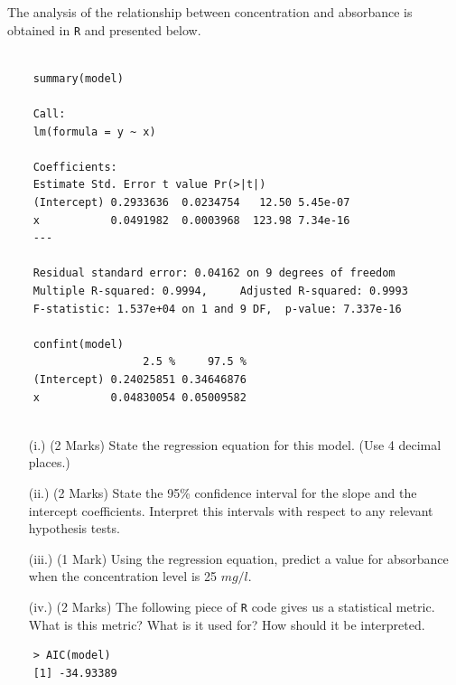 \documentclass[a4paper,12pt]{article}
\begin{document}
\noindent The analysis of the relationship between concentration and absorbance is obtained in \texttt{R} and presented below. 
\begin{framed}
	\begin{verbatim}

	summary(model)
	
	Call:
	lm(formula = y ~ x)
	
	Coefficients:
	Estimate Std. Error t value Pr(>|t|)    
	(Intercept) 0.2933636  0.0234754   12.50 5.45e-07 
	x           0.0491982  0.0003968  123.98 7.34e-16 
	---
	
	Residual standard error: 0.04162 on 9 degrees of freedom
	Multiple R-squared: 0.9994,     Adjusted R-squared: 0.9993 
	F-statistic: 1.537e+04 on 1 and 9 DF,  p-value: 7.337e-16 
	
	confint(model)
	                 2.5 %     97.5 %
	(Intercept) 0.24025851 0.34646876
	x           0.04830054 0.05009582
	
	\end{verbatim}
\end{framed}
\newpage
\begin{itemize}
	\item[(i.)] (2 Marks)
	State the regression equation for this model. (Use 4 decimal places.) %
	\item[(ii.)]  (2 Marks) State the 95\% confidence interval for the slope and the intercept coefficients. Interpret this intervals with respect to any relevant hypothesis tests.
	\item[(iii.)] (1 Mark) Using the regression equation, predict a value for absorbance when the concentration level is 25 $mg/l$.
	\item[(iv.)] (2 Marks) The following piece of \texttt{R} code gives us a statistical metric. What is this metric? What is it used for? How should it be interpreted.
	
\end{itemize}
\begin{framed}
	\begin{verbatim}
	> AIC(model)
	[1] -34.93389	
	\end{verbatim}
\end{framed}
\end{document}
